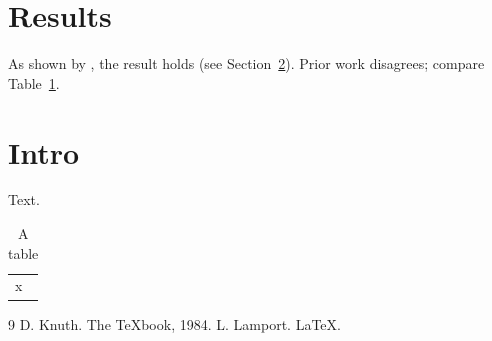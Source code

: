 \documentclass{article}
\begin{document}
\section{Results}\label{sec:res}
As shown by \cite{lamport}, the result holds (see Section~\ref{sec:intro}).
Prior work \cite[p.~5]{lamport,knuth} disagrees; compare Table~\ref{tab:a}.
\section{Intro}\label{sec:intro}
Text.
\begin{table}[h]
\centering
\begin{tabular}{l}
x
\end{tabular}
\caption{A table}\label{tab:a}
\end{table}
\begin{thebibliography}{9}
 D. Knuth. The TeXbook, 1984.
 L. Lamport. LaTeX.
\end{thebibliography}
\end{document}
